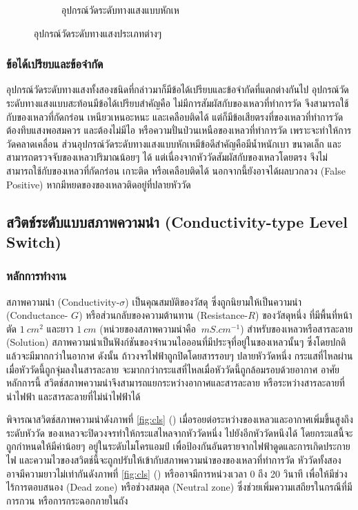 \documentclass[final,11pt,a4paper]{article}
\begin{document}
\begin{figure}
\begin{subfigure}[b]{0.35\textwidth}
        \caption{อุปกรณ์วัดระดับทางแสงแบบหักเห}
        \label{fig:ols2}
    \end{subfigure}
    \hfill
    \caption{อุปกรณ์วัดระดับทางแสงประเภทต่างๆ}
    \label{fig:ols}
\end{figure}


\subsubsection{ข้อได้เปรียบและข้อจำกัด}
อุปกรณ์วัดระดับทางแสงทั้งสองชนิดที่กล่าวมาก็มีข้อได้เปรียบและข้อจำกัดที่แตกต่างกันไป อุปกรณ์วัดระดับทางแสงแบบสะท้อนมีข้อได้เปรียบสำคัญคือ
ไม่มีการสัมผัสกับของเหลวที่ทำการวัด จึงสามารถใช้กับของเหลวที่กัดกร่อน เหนียวเหนอะหนะ และเคลือบติดได้ แต่ก็มีข้อเสียตรงที่ของเหลวที่ทำการวัดต้องทึบแสงพอสมควร
และต้องไม่มีไอ หรือความปั่นป่วนเหนือของเหลวที่ทำการวัด เพราะจะทำให้การวัดคลาดเคลื่อน ส่วนอุปกรณ์วัดระดับทางแสงแบบหักเหมีข้อดีสำคัญคือมีน้ำหนักเบา ขนาดเล็ก
และสามารถตรวจจับของเหลวปริมาณน้อยๆ ได้ แต่เนื่องจากหัววัดสัมผัสกับของเหลวโดยตรง จึงไม่สามารถใช้กับของเหลวที่กัดกร่อน เกาะติด หรือเคลือบติดได้ 
นอกจากนี้ยังอาจได้ผลบวกลวง (False Positive) หากมีหยดของของเหลวติดอยู่ที่ปลายหัววัด



\subsection{สวิตช์ระดับแบบสภาพความนำ (Conductivity-type Level Switch)}
\subsubsection{หลักการทำงาน}
สภาพความนำ (Conductivity-$\sigma$) เป็นคุณสมบัติของวัสดุ ซึ่งถูกนิยามให้เป็นความนำ (Conductance- $G$) 
หรือส่วนกลับของความต้านทาน (Resistance-$R$) ของวัสดุหนึ่ง ที่มีพื้นที่หน้าตัด $\SI{1}{cm^2}$ และยาว $\SI{1}{cm}$ 
(หน่วยของสภาพความนำคือ $\SI{}{mS.cm^{-1}}$) สำหรับของเหลวหรือสารละลาย (Solution) 
สภาพความนำเป็นฟังก์ชันของจำนวนไอออนที่มีประจุที่อยู่ในของเหลวนั้นๆ ซึ่งโดยปกติแล้วจะมีมากกว่าในอากาศ ดังนั้น 
ถ้าวงจรไฟฟ้าถูกปิดโดยสารรอบๆ ปลายหัววัดหนึ่ง กระแสที่ไหลผ่านเมื่อหัววัดนี้ถูกจุ่มลงในสารละลาย จะมากกว่ากระแสที่ไหลเมื่อหัววัดนี้ถูกล้อมรอบด้วยอากาศ
อาศัยหลักการนี้ สวิตช์สภาพความนำจึงสามารถแยกระหว่างอากาศและสารละลาย หรือระหว่างสารละลายที่นำไฟฟ้า และสารละลายที่ไม่นำไฟฟ้าได้ 

พิจารณาสวิตช์สภาพความนำดังภาพที่ \ref{fig:cls} () เมื่อรอยต่อระหว่างของเหลวและอากาศเพิ่มขึ้นสูงถึงระดับหัววัด ของเหลวจะปิดวงจรทำให้กระแสไหลจากหัววัดหนึ่ง
ไปยังอีกหัววัดหนึงได้ โดยกระแสนี้จะถูกกำหนดให้มีค่าน้อยๆ อยู่ในระดับไมโครแอมป์ เพื่อป้องกันอันตรายจากไฟฟ้าดูดและการเกิดประกายไฟ 
และความไวของสวิตช์นี้จะถูกปรับให้เข้ากับสภาพความนำของของเหลวที่ทำการวัด หัววัดทั้งสองอาจมีความยาวไม่เท่ากันดังภาพที่ \ref{fig:cls} () หรืออาจมีการหน่วงเวลา 0 ถึง 20 วินาที 
เพื่อให้มีช่วงไร้การตอบสนอง (Dead zone) หรือช่วงสมดุล (Neutral zone) ซึ่งช่วยเพิ่มความเสถียรในกรณีที่มีการกวน หรือการกระฉอกภายในถัง 
\end{document}
